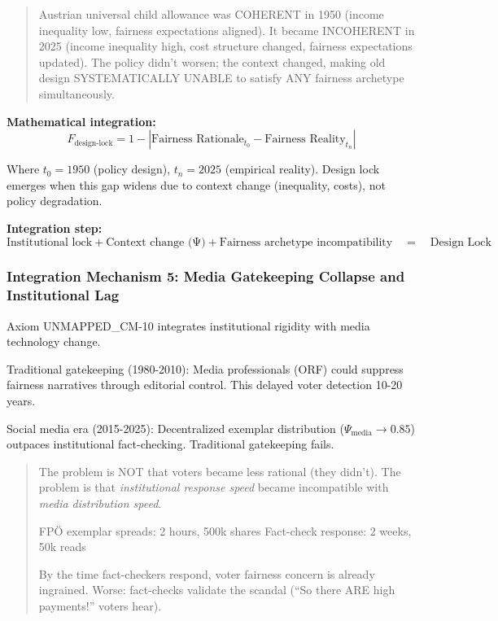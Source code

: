 \begin{quote}
Austrian universal child allowance was COHERENT in 1950 (income inequality low, fairness expectations aligned).
It became INCOHERENT in 2025 (income inequality high, cost structure changed, fairness expectations updated).
The policy didn't worsen; the context changed, making old design SYSTEMATICALLY UNABLE to satisfy
ANY fairness archetype simultaneously.
\end{quote}

\textbf{Mathematical integration:}
\begin{equation}
F_{\text{design-lock}} = 1 - |\text{Fairness Rationale}_{t_0} - \text{Fairness Reality}_{t_n}|
\end{equation}

Where $t_0 = 1950$ (policy design), $t_n = 2025$ (empirical reality). Design lock emerges when this gap
widens due to context change (inequality, costs), not policy degradation.

\textbf{Integration step:}
\begin{equation}
\text{Institutional lock} + \text{Context change (Ψ)} + \text{Fairness archetype incompatibility} \quad = \quad \text{Design Lock}
\end{equation}

\subsubsection{Integration Mechanism 5: Media Gatekeeping Collapse and Institutional Lag}

Axiom UNMAPPED_CM-10 integrates institutional rigidity with media technology change.

Traditional gatekeeping (1980-2010): Media professionals (ORF) could suppress fairness narratives through
editorial control. This delayed voter detection 10-20 years.

Social media era (2015-2025): Decentralized exemplar distribution ($\Psi_{\text{media}} \rightarrow 0.85$) outpaces
institutional fact-checking. Traditional gatekeeping fails.

\begin{quote}
The problem is NOT that voters became less rational (they didn't). The problem is that
\textit{institutional response speed} became incompatible with \textit{media distribution speed}.

FPÖ exemplar spreads: 2 hours, 500k shares
Fact-check response: 2 weeks, 50k reads

By the time fact-checkers respond, voter fairness concern is already ingrained. Worse: fact-checks
validate the scandal (``So there ARE high payments!'' voters hear).
\end{quote}

